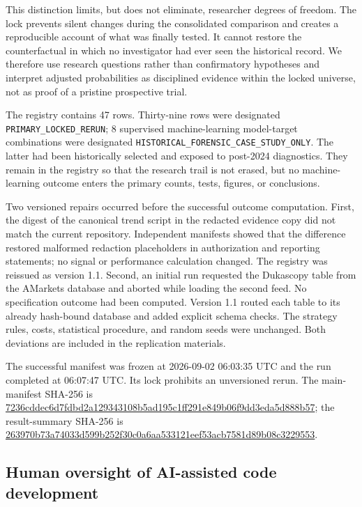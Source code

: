 This distinction limits, but does not eliminate, researcher degrees of freedom. The lock prevents silent changes during the consolidated comparison and creates a reproducible account of what was finally tested. It cannot restore the counterfactual in which no investigator had ever seen the historical record. We therefore use research questions rather than confirmatory hypotheses and interpret adjusted probabilities as disciplined evidence within the locked universe, not as proof of a pristine prospective trial.

The registry contains 47 rows. Thirty-nine rows were designated \texttt{PRIMARY\_LOCKED\_RERUN}; 8 supervised machine-learning model-target combinations were designated \texttt{HISTORICAL\_FORENSIC\_CASE\_STUDY\_ONLY}. The latter had been historically selected and exposed to post-2024 diagnostics. They remain in the registry so that the research trail is not erased, but no machine-learning outcome enters the primary counts, tests, figures, or conclusions.

Two versioned repairs occurred before the successful outcome computation. First, the digest of the canonical trend script in the redacted evidence copy did not match the current repository. Independent manifests showed that the difference restored malformed redaction placeholders in authorization and reporting statements; no signal or performance calculation changed. The registry was reissued as version 1.1. Second, an initial run requested the Dukascopy table from the AMarkets database and aborted while loading the second feed. No specification outcome had been computed. Version 1.1 routed each table to its already hash-bound database and added explicit schema checks. The strategy rules, costs, statistical procedure, and random seeds were unchanged. Both deviations are included in the replication materials.

The successful manifest was frozen at 2026-09-02 06:03:35 UTC and the run completed at 06:07:47 UTC. Its lock prohibits an unversioned rerun. The main-manifest SHA-256 is \url{7236cddec6d7fdbd2a129343108b5ad195c1ff291e849b06f9dd3eda5d888b57}; the result-summary SHA-256 is \url{263970b73a74033d599b252f30c0a6aa533121eef53acb7581d89b08c3229553}.

\subsection{Human oversight of AI-assisted code development}

